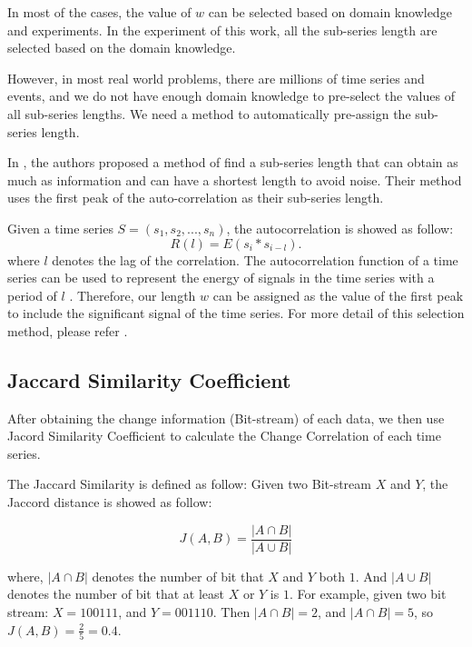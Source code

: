 In most of the cases, the value of $w$ can be selected based on domain knowledge and experiments. In the experiment of this work, all the sub-series length are selected based on the domain knowledge. 

However, in most real world problems, there are millions of time series and events, and we do not have enough domain knowledge to pre-select the values of all sub-series lengths. We need a method to automatically pre-assign the sub-series length.

In \cite{ding2015yading,luo2014correlating}, the authors proposed a method of find a sub-series length that can obtain as much as information and can have a shortest length to avoid noise.
Their method uses the first peak of the auto-correlation as their sub-series length.

Given a time series $S=(s_1,s_2,...,s_n)$, the autocorrelation is showed as follow:
\begin{equation}
R(l) = E(s_i*s_{i-l}).
\end{equation}
where $l$ denotes the lag of the correlation. The autocorrelation function of a time series can be used to represent the energy of signals in the time series with a period of $l$ \cite{hamilton1994time}. Therefore, our length $w$ can be assigned as the value of the first peak to include the significant signal of the time series. For more detail of this selection method, please refer \cite{luo2014correlating,ding2015yading}.

\subsection{Jaccard Similarity Coefficient}

After obtaining the change information (Bit-stream) of each data, we then use Jacord Similarity Coefficient to calculate the Change Correlation of each time series.

The Jaccard Similarity \cite{han2011data} is defined as follow:
Given two Bit-stream $X$ and $Y$, the Jaccord distance is showed as follow:

\begin{equation}
J(A,B) = \frac{|A \cap B|}{|A \cup B|}
\end{equation}

where, $|A \cap B|$ denotes the number of bit that $X$ and $Y$ both $1$. And $|A \cup B|$ denotes the number of bit that at least $X$ or $Y$ is $1$.
For example, given two bit stream: $X={100111}$, and $Y={001110}$. Then $|A \cap B| = 2$, and $|A \cap B| = 5$, so $J(A,B) = \frac{2}{5} = 0.4$.

